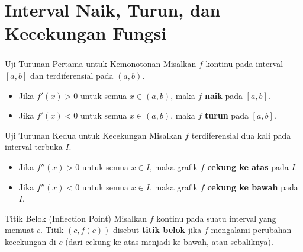 \documentclass{../../kalkulus-ppt}
\begin{document}
\section{Interval Naik, Turun, dan Kecekungan Fungsi}
\begin{frame}
  \frametitle{\insertsection}
  \begin{teorema}{Uji Turunan Pertama untuk Kemonotonan}
    Misalkan $f$ kontinu pada interval $[a,b]$ dan terdiferensial pada $(a,b)$.
    \begin{itemize}
      \item Jika $f'(x) > 0$ untuk semua $x \in (a,b)$, maka $f$ \textbf{naik} pada $[a,b]$.
      \item Jika $f'(x) < 0$ untuk semua $x \in (a,b)$, maka $f$ \textbf{turun} pada $[a,b]$.
    \end{itemize}
  \end{teorema}
  \pause
  \begin{teorema}{Uji Turunan Kedua untuk Kecekungan}
    Misalkan $f$ terdiferensial dua kali pada interval terbuka $I$.
    \begin{itemize}
      \item Jika $f''(x) > 0$ untuk semua $x \in I$, maka grafik $f$ \textbf{cekung ke atas} pada $I$.
      \item Jika $f''(x) < 0$ untuk semua $x \in I$, maka grafik $f$ \textbf{cekung ke bawah} pada $I$.
    \end{itemize}
  \end{teorema}
  \pause
  \begin{definisi}{Titik Belok (Inflection Point)}
    Misalkan $f$ kontinu pada suatu interval yang memuat $c$. Titik $(c, f(c))$ disebut \textbf{titik belok} jika $f$ mengalami perubahan kecekungan di $c$ (dari cekung ke atas menjadi ke bawah, atau sebaliknya).
  \end{definisi}
\end{frame}
\end{document}
